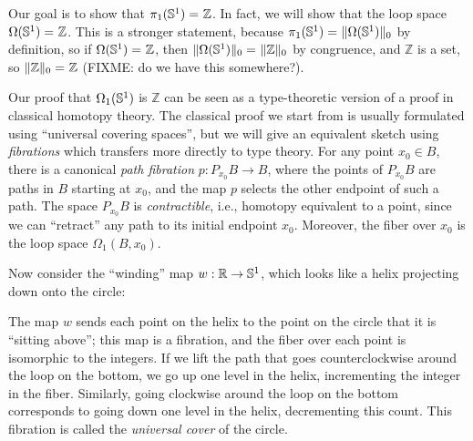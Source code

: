 Our goal is to show that $\id {\pi_1(\Sn ^1)} {\mathbb{Z}}$.  In fact, we
will show that the loop space $\id {\Omega(\Sn ^1)} {\mathbb{Z}}$.  This is a stronger
statement, because $\id{\pi_1(\Sn ^1)} {\trunc 0 {\Omega(\Sn ^1)}}$ by
definition, so if $\id {\Omega(\Sn ^1)} {\mathbb{Z}}$, then $\id {\trunc
  0 {\Omega(\Sn ^1)}} {\trunc 0 {\mathbb{Z}}}$ by congruence, and
$\mathbb{Z}$ is a set, so $\id {\trunc 0 {\mathbb{Z}}} {\mathbb{Z}}$
(FIXME: do we have this somewhere?).  

Our proof that $\Omega_1(\Sn ^1)$ is $\mathbb{Z}$ can be seen as a
type-theoretic version of a proof in classical homotopy theory.  The
classical proof we start from is usually formulated using ``universal
covering spaces'', but we will give an equivalent sketch using
\emph{fibrations} which transfers more directly to type theory.  For any
point $x_0\in B$, there is a canonical \emph{path fibration} $p:P_{x_0}
B \to B$, where the points of $P_{x_0} B$ are paths in $B$ starting at
$x_0$, and the map $p$ selects the other endpoint of such a path.  The
space $P_{x_0} B$ is \emph{contractible}, i.e., homotopy equivalent to a
point, since we can ``retract'' any path to its initial endpoint $x_0$.
Moreover, the fiber over $x_0$ is the loop space $\Omega_1(B,x_0)$.

Now consider the ``winding'' map $w:\mathbb{R}\to \Sn ^1$, which
looks like a helix projecting down onto the circle:
\begin{center}
\end{center}
The map $w$ sends each point on the helix to the point on the circle
that it is ``sitting above''; this map is a fibration, and the fiber
over each point is isomorphic to the integers.  If we lift the path that
goes counterclockwise around the loop on the bottom, we go up one level in the
helix, incrementing the integer in the fiber.  Similarly, going
clockwise around the loop on the bottom corresponds to going down
one level in the helix, decrementing this count.  This fibration is
called the \emph{universal cover} of the circle.

